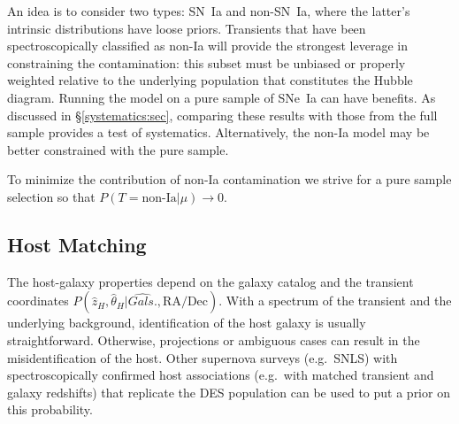 \documentclass[preprint]{aastex}
\begin{document}
An idea is to consider two types: SN~Ia and non-SN~Ia, where the latter's
intrinsic distributions have loose priors.  Transients that have been spectroscopically
classified as non-Ia will provide the strongest leverage in constraining the
contamination: this subset must be unbiased or properly weighted
relative to the underlying population that constitutes the Hubble diagram.
Running the model on a pure sample of SNe~Ia can have benefits.
As discussed in \S\ref{systematics:sec}, comparing these results with
those from the full sample provides
a test of systematics.  Alternatively, the non-Ia model may be better constrained
with the pure sample.


To minimize the contribution of non-Ia contamination we strive for
a pure sample selection so that $P(T=\text{non-Ia}| \mu) \rightarrow 0$.


\subsection{Host Matching}
\sloppy
The host-galaxy properties depend on the galaxy catalog and the transient
coordinates $P(\hat{z}_H, \hat{\theta}_H | \hat{\mathit{Gals.}}, \text{RA/Dec})$.  With a
spectrum of the transient and the underlying background, identification of the host galaxy
is usually straightforward.
Otherwise, projections or ambiguous cases can result in the misidentification of
the host.
Other supernova surveys (e.g.\ SNLS) 
with spectroscopically confirmed host associations (e.g.\ with
matched transient and galaxy redshifts) that replicate the DES population
can be used to put a prior on this probability.



\end{document}
